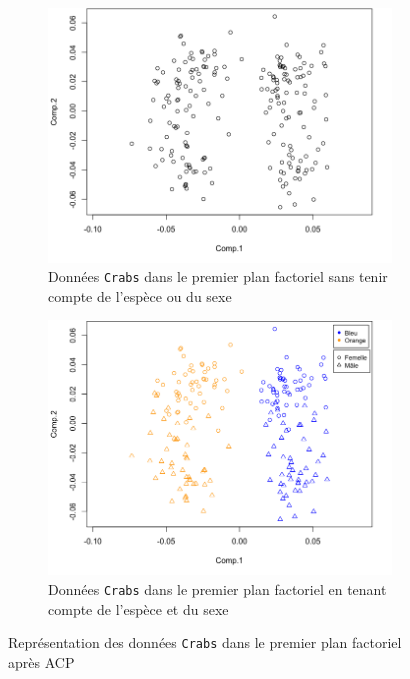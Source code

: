 \documentclass[a4paper,10pt]{report}
\begin{document}
\begin{figure}[H]
	\centering
	\captionsetup{justification=centering, margin=2cm}
	\begin{subfigure}[b]{0.5\linewidth}
		\centering
		\captionsetup{justification=centering, margin=1cm}
		\includegraphics[width=1\linewidth]{img/1-crabs-acp-premier-plan-factoriel}
		\caption{\small Données \texttt{Crabs} dans le premier plan factoriel sans tenir compte de l'espèce ou du sexe}
		\label{fig:1-crabs-acp-premier-plan-factoriel}
	\end{subfigure}%
	\begin{subfigure}[b]{0.5\linewidth}
		\centering
		\captionsetup{justification=centering, margin=1cm}
		\includegraphics[width=1\linewidth]{img/1-crabs-acp-premier-plan-factoriel-discr-species-and-sex}
		\caption{\small Données \texttt{Crabs} dans le premier plan factoriel en tenant compte de l'espèce et du sexe}
		\label{fig:1-crabs-acp-premier-plan-factoriel-discr-species-and-sex}
	\end{subfigure}%
	\caption{\small Représentation des données \texttt{Crabs} dans le premier plan factoriel après ACP}
	\label{fig:1-crabs-acp-representation-graphique}%
\end{figure}
\end{document}
